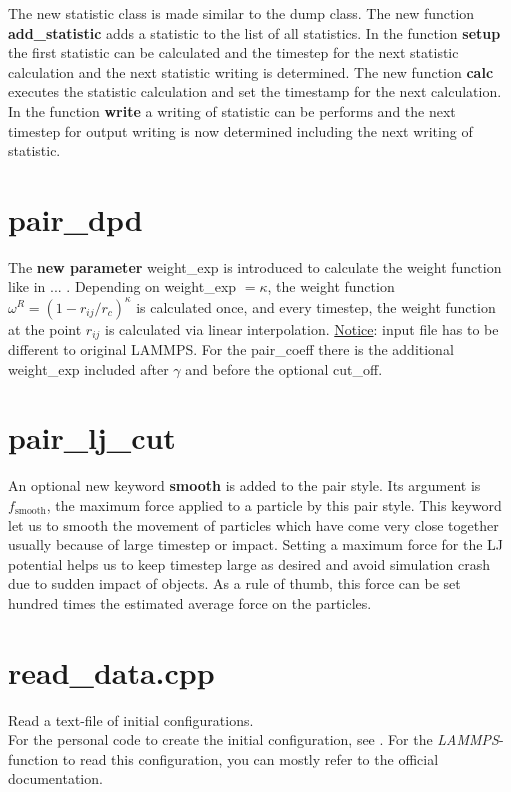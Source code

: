 The new statistic class is made similar to the dump class. The new function \textbf{add\_sta\-tist\-ic} adds a statistic to the list of all statistics. In the function \textbf{setup} the first statistic can be calculated and the timestep for the next statistic calculation and the next statistic writing is determined. The new function \textbf{calc} executes the statistic calculation and set the timestamp for the next calculation. In the function \textbf{write} a writing of statistic can be performs and the next timestep for output writing is now determined including the next writing of statistic.


\section{pair\_dpd}

The \textbf{new parameter} weight\_exp is introduced to calculate the weight function like in ... . Depending on weight\_exp $=\kappa$, the weight function $\omega^R = \left(1-r_{ij}/r_c\right)^{\kappa}$ is calculated once, and every timestep, the weight function at the point $r_{ij}$ is calculated via linear interpolation.
\underline{Notice}: input file has to be different to original LAMMPS. For the pair\_coeff there is the additional weight\_exp included after $\gamma$ and before the optional cut\_off.

\section{pair\_lj\_cut}
\label{sec:pair_lj_cut}

An optional new keyword \textbf{smooth} is added to the pair style. Its argument is $f_{\mathrm{smooth}}$, the maximum force applied to a particle by this pair style. This keyword let us to smooth the movement of particles which have come very close together usually because of large timestep or impact. Setting a maximum force for the LJ potential helps us to keep timestep large as desired and avoid simulation crash due to sudden impact of objects. As a rule of thumb, this force can be set hundred times the estimated average force on the particles.

\section{read\_data.cpp}
Read a text-file of initial configurations.\\For the personal code to create the initial configuration, see . For the \textit{LAMMPS}-function to read this configuration, you can mostly refer to the official documentation.


